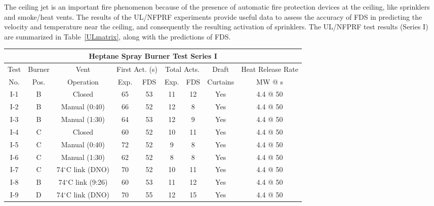 The ceiling jet is an important fire phenomenon because of the presence of automatic fire protection devices at the ceiling, like
sprinklers and smoke/heat vents. The results of the UL/NFPRF experiments provide useful data to assess the accuracy of FDS in predicting
the velocity and temperature near the ceiling, and consequently the resulting activation of sprinklers.
The UL/NFPRF test results (Series I) are summarized in Table~\ref{ULmatrix}, along with the predictions of FDS.

\begin{table}[h]
\begin{center}
\begin{tabular}{|c||c|c|c|c|c|c|c|c|}
\hline
\multicolumn{9}{|c|}{\bf Heptane Spray Burner Test Series I}  \\ \hline \hline
Test & Burner & Vent                    & \multicolumn{2}{|c|}{First Act. (s) } & \multicolumn{2}{|c|}{Total Acts.}  & Draft    & Heat Release Rate \\ \cline{4-7}
No.  & Pos.   & Operation               & Exp. & FDS                            & Exp.  & FDS                        & Curtains & MW @ s \\
\hline \hline
I-1   & B  & Closed                     & 65   & 53                             & 11   & 12     & Yes  & 4.4 @ 50  \\ \hline
I-2   & B  & Manual (0:40)              & 66   & 52                             & 12   & 8      & Yes  & 4.4 @ 50  \\ \hline
I-3   & B  & Manual (1:30)              & 64   & 53                             & 12   & 9      & Yes  & 4.4 @ 50  \\ \hline
I-4   & C  & Closed                     & 60   & 52                             & 10   & 11     & Yes  & 4.4 @ 50  \\ \hline
I-5   & C  & Manual (0:40)              & 72   & 52                             & 9    & 8      & Yes  & 4.4 @ 50  \\ \hline
I-6   & C  & Manual (1:30)              & 62   & 52                             & 8    & 8      & Yes  & 4.4 @ 50  \\ \hline
I-7   & C  & 74$^\circ$C link (DNO)     & 70   & 52                             & 10   & 11     & Yes  & 4.4 @ 50  \\ \hline
I-8   & B  & 74$^\circ$C link (9:26)    & 60   & 53                             & 11   & 12     & Yes  & 4.4 @ 50  \\ \hline
I-9   & D  & 74$^\circ$C link (DNO)     & 70   & 55                             & 12   & 15     & Yes  & 4.4 @ 50  \\ \hline

\end{tabular}
\end{center}
\end{table}
